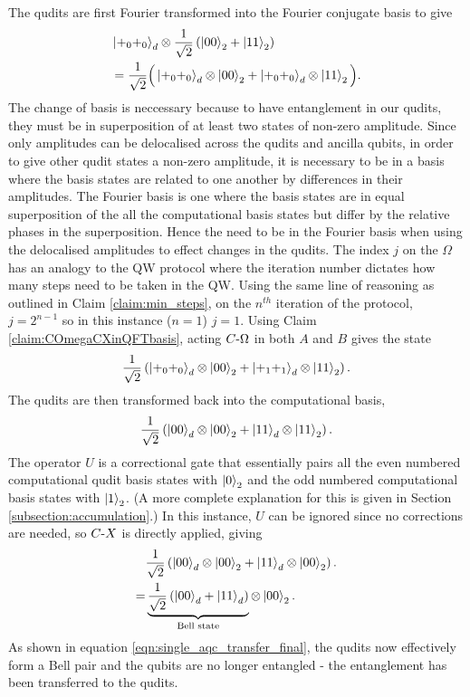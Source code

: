 The qudits are first Fourier transformed into the Fourier conjugate basis to give
\begin{align}
    &\ket{+_0 +_0}_d\otimes\frac{1}{\sqrt{2}}\left(\ket{00}_2 + \ket{11}_2\right)\\
    &=\frac{1}{\sqrt{2}}\Big(
        \ket{+_0 +_0}_d \otimes \ket{00}_2
        +\ket{+_0 +_0}_d \otimes \ket{11}_2
        \Big).
\end{align}
The change of basis is neccessary because to have entanglement in our qudits, they must be in superposition of at least two states of non-zero amplitude.
Since only amplitudes can be delocalised across the qudits and ancilla qubits, in order to give other qudit states a non-zero amplitude, it is necessary to be in a basis where the basis states are related to one another by differences in their amplitudes.
The Fourier basis is one where the basis states are in equal superposition of the all the computational basis states but differ by the relative phases in the superposition.
Hence the need to be in the Fourier basis when using the delocalised amplitudes to effect changes in the qudits.
The index $j$ on the $\Omega$ has an analogy to the QW protocol where the iteration number dictates how many steps need to be taken in the QW.
Using the same line of reasoning as outlined in Claim \ref{claim:min_steps}, on the $n^{th}$ iteration of the protocol, $j = 2^{n-1}$ so in this instance ($n=1$) $j=1$.
Using Claim \ref{claim:COmegaCXinQFTbasis}, acting $C\text{-}\Omega$ in both $A$ and $B$ gives the state
\begin{equation}
    \frac{1}{\sqrt{2}}\left(
        \ket{+_0 +_0}_d \otimes \ket{00}_2
        +\ket{+_1 +_1}_d \otimes \ket{11}_2
        \right).
\end{equation}
The qudits are then transformed back into the computational basis,
\begin{equation}
    \frac{1}{\sqrt{2}}\left(
        \ket{0 0}_d \otimes \ket{00}_2
        +\ket{1 1}_d \otimes \ket{11}_2
        \right).
\end{equation}
The operator $U$ is a correctional gate that essentially pairs all the even numbered computational qudit basis states with $\ket{0}_2$ and the odd numbered computational basis states with $\ket{1}_2$.
(A more complete explanation for this is given in Section \ref{subsection:accumulation}.)
In this instance, $U$ can be ignored since no corrections are needed, so $C\text{-}X$ is directly applied, giving
\begin{align}
    &\frac{1}{\sqrt{2}}\left(
        \ket{00}_d \otimes \ket{00}_2
        +\ket{11}_d \otimes \ket{00}_2
        \right).\\
    =&\underbrace{
        \frac{1}{\sqrt{2}}\left(\ket{00}_d +\ket{11}_d\right)
    }_{\text{Bell state}}
    \otimes \ket{00}_2.    
    \label{eqn:single_aqc_transfer_final}
\end{align}
As shown in equation \ref{eqn:single_aqc_transfer_final}, the qudits now effectively form a Bell pair and the qubits are no longer entangled - the entanglement has been transferred to the qudits.

